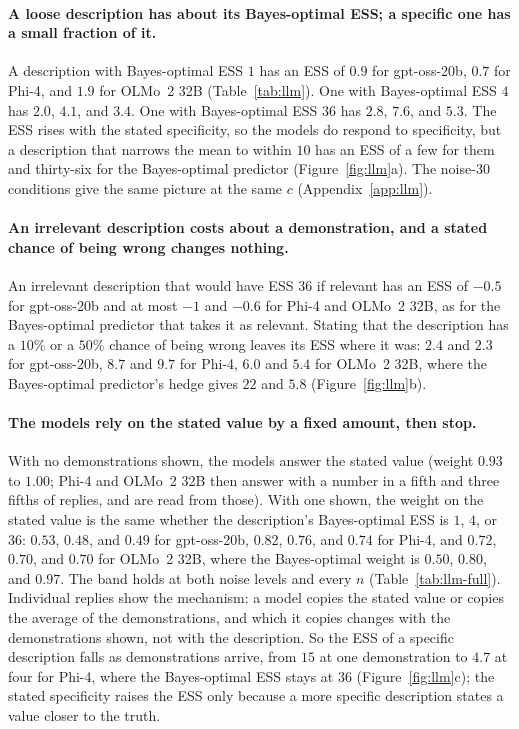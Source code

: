 \documentclass{article}
\begin{document}
\paragraph{A loose description has about its Bayes-optimal ESS; a specific one has a small fraction of it.} A description with Bayes-optimal ESS $1$ has an ESS of $0.9$ for gpt-oss-20b, $0.7$ for Phi-4, and $1.9$ for OLMo~2 32B (Table~\ref{tab:llm}). One with Bayes-optimal ESS $4$ has $2.0$, $4.1$, and $3.4$. One with Bayes-optimal ESS $36$ has $2.8$, $7.6$, and $5.3$. The ESS rises with the stated specificity, so the models do respond to specificity, but a description that narrows the mean to within $10$ has an ESS of a few for them and thirty-six for the Bayes-optimal predictor (Figure~\ref{fig:llm}a). The noise-$30$ conditions give the same picture at the same $c$ (Appendix~\ref{app:llm}).

\paragraph{An irrelevant description costs about a demonstration, and a stated chance of being wrong changes nothing.} An irrelevant description that would have ESS $36$ if relevant has an ESS of $-0.5$ for gpt-oss-20b and at most $-1$ and $-0.6$ for Phi-4 and OLMo~2 32B, as for the Bayes-optimal predictor that takes it as relevant. Stating that the description has a $10\%$ or a $50\%$ chance of being wrong leaves its ESS where it was: $2.4$ and $2.3$ for gpt-oss-20b, $8.7$ and $9.7$ for Phi-4, $6.0$ and $5.4$ for OLMo~2 32B, where the Bayes-optimal predictor's hedge gives $22$ and $5.8$ (Figure~\ref{fig:llm}b).

\paragraph{The models rely on the stated value by a fixed amount, then stop.} With no demonstrations shown, the models answer the stated value (weight $0.93$ to $1.00$; Phi-4 and OLMo~2 32B then answer with a number in a fifth and three fifths of replies, and are read from those). With one shown, the weight on the stated value is the same whether the description's Bayes-optimal ESS is $1$, $4$, or $36$: $0.53$, $0.48$, and $0.49$ for gpt-oss-20b, $0.82$, $0.76$, and $0.74$ for Phi-4, and $0.72$, $0.70$, and $0.70$ for OLMo~2 32B, where the Bayes-optimal weight is $0.50$, $0.80$, and $0.97$. The band holds at both noise levels and every $n$ (Table~\ref{tab:llm-full}). Individual replies show the mechanism: a model copies the stated value or copies the average of the demonstrations, and which it copies changes with the demonstrations shown, not with the description. So the ESS of a specific description falls as demonstrations arrive, from $15$ at one demonstration to $4.7$ at four for Phi-4, where the Bayes-optimal ESS stays at $36$ (Figure~\ref{fig:llm}c); the stated specificity raises the ESS only because a more specific description states a value closer to the truth.
\end{document}
